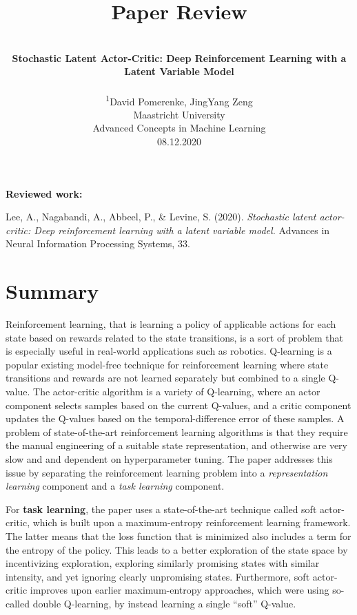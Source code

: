 \documentclass[letterpaper]{article} %
\title{Paper Review}
\author{\\ \Large \textbf{Stochastic Latent Actor-Critic: Deep Reinforcement Learning with a Latent Variable Model} \\ \Large \textbf{}\\ %
\textsuperscript{\rm 1}David Pomerenke, JingYang Zeng\\ %
Maastricht University\\
Advanced Concepts in Machine Learning\\
08.12.2020 %
}
\begin{document}
\maketitle


\textbf{Reviewed work:}

Lee, A., Nagabandi, A., Abbeel, P., \& Levine, S. (2020). 
\textit{Stochastic latent actor-critic: Deep reinforcement learning with a latent variable model.}
Advances in Neural Information Processing Systems, 33.


\section{Summary}

Reinforcement learning, that is learning a policy of applicable actions for each state based on  rewards related to the state transitions, is a sort of problem that is especially useful in real-world applications such as robotics. Q-learning is a popular existing model-free technique for reinforcement learning where state transitions and rewards are not learned separately but combined to a single Q-value. The actor-critic algorithm is a variety of Q-learning, where an actor component selects samples based on the current Q-values, and a critic component updates the Q-values based on the temporal-difference error of these samples. A problem of state-of-the-art reinforcement learning algorithms is that they require the manual engineering of a suitable state representation, and otherwise are very slow and and dependent on hyperparameter tuning. The paper addresses this issue by separating the reinforcement learning problem into a \textit{representation learning} component and a \textit{task learning} component. 

For \textbf{task learning}, the paper uses a state-of-the-art technique called soft actor-critic, which is built upon a maximum-entropy reinforcement learning framework. The latter means that the loss function that is minimized also includes a term for the entropy of the policy. This leads to a better exploration of the state space by incentivizing exploration, exploring similarly promising states with similar intensity, and yet ignoring clearly unpromising states.\cite{haarnoja2018soft} Furthermore, soft actor-critic improves upon earlier maximum-entropy approaches, which were using so-called double Q-learning, by instead learning a single “soft” Q-value.\cite{duan2020distributional}
\end{document}
